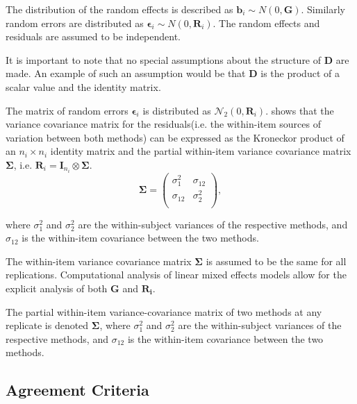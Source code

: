\documentclass[12pt, a4paper]{report}
\theoremstyle{plain}
\theoremstyle{definition}
\theoremstyle{remark}
\begin{document}
	
	
	The distribution of the random effects is described as $\boldsymbol{b}_i \sim N(0,\boldsymbol{G})$. Similarly  random errors are distributed as $\boldsymbol{\epsilon}_i \sim N(0,\boldsymbol{R}_i)$. The random effects and residuals are assumed to be independent.
	
	
	It is important to note that no special assumptions about the structure of $\boldsymbol{D}$ are made. An example of such an assumption would be that $\boldsymbol{D}$ is the product of a scalar value and the identity matrix.
	
	
	The matrix of random errors $\boldsymbol{\epsilon}_i$ is distributed as $\mathcal{N}_2(0,\boldsymbol{R}_i)$. \citet{hamlett} shows that the variance covariance matrix for the residuals(i.e. the within-item sources of variation between both methods) can be expressed as the Kroneckor product of an $n_i \times n_i$ identity matrix and the partial within-item variance covariance matrix $\boldsymbol{\Sigma}$, i.e. $\boldsymbol{R}_{i} = \boldsymbol{I}_{n_{i}} \otimes \boldsymbol{\Sigma}$.
	\[
	\boldsymbol{\Sigma} = \left( \begin{array}{cc}
	\sigma^2_{1} & \sigma_{12} \\
	\sigma_{12} & \sigma^2_{2} \\
	\end{array}\right),
	\]
	
	where $\sigma^2_{1}$ and $\sigma^2_{2}$ are the within-subject variances of the respective methods, and $\sigma_{12}$ is the within-item covariance between the two methods. 
	
	The within-item variance covariance matrix $\boldsymbol{\Sigma}$ is assumed to be the same for all replications. Computational analysis of linear mixed effects models allow for the explicit analysis of both $\boldsymbol{G}$ and $\boldsymbol{R_i}$. 
	
	The partial within-item variance-covariance matrix of two methods at any replicate is denoted $\boldsymbol{\Sigma}$, where $\sigma^2_{1}$ and $\sigma^2_{2}$ are the within-subject variances of the respective methods, and $\sigma_{12}$ is the within-item covariance between the two methods. 
	
	
	
	
	\subsection{Agreement Criteria}	
	
\end{document}
